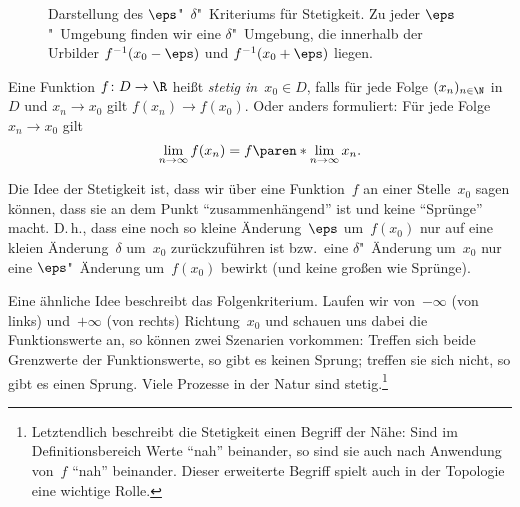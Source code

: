 \documentclass[a4paper]{article}
\begin{document}
\begin{figure}
    \caption{Darstellung des $\eps$"~$\delta$"~Kriteriums für Stetigkeit. Zu jeder $\eps$"~Umgebung finden wir eine $\delta$"~Umgebung, die innerhalb der Urbilder $f^{-1}(x_0-\eps)$ und $f^{-1}(x_0+\eps)$ liegen.}
\end{figure}

\begin{definition}\label{def:continuity:sequence}
    Eine Funktion $f\colon D \to \R$ heißt \emph{stetig in~$x_0 \in D$}, falls für jede Folge $(x_n)_{n\in\N}$ in~$D$ und $x_n \to x_0$ gilt $f(x_n) \to f(x_0)$. Oder anders formuliert: Für jede Folge $x_n \to x_0$ gilt
    \begin{equation*}
        \lim_{n\to\infty} f(x_n) = f\paren*{\lim_{n\to\infty} x_n}.
    \end{equation*}
\end{definition}

Die Idee der Stetigkeit ist, dass wir über eine Funktion~$f$ an einer Stelle~$x_0$ sagen können, dass sie an dem Punkt "`zusammenhängend"' ist und keine "`Sprünge"' macht. D.\,h., dass eine noch so kleine Änderung~$\eps$ um~$f(x_0)$ nur auf eine kleien Änderung~$\delta$ um~$x_0$ zurückzuführen ist bzw.\ eine $\delta$"~Änderung um~$x_0$ nur eine $\eps$"~Änderung um~$f(x_0)$ bewirkt (und keine großen wie Sprünge).

Eine ähnliche Idee beschreibt das Folgenkriterium. Laufen wir von~$-\infty$ (von links) und~$+\infty$ (von rechts) Richtung~$x_0$ und schauen uns dabei die Funktionswerte an, so können zwei Szenarien vorkommen: Treffen sich beide Grenzwerte der Funktionswerte, so gibt es keinen Sprung; treffen sie sich nicht, so gibt es einen Sprung. Viele Prozesse in der Natur sind stetig.\footnote{Letztendlich beschreibt die Stetigkeit einen Begriff der Nähe: Sind im Definitionsbereich Werte "`nah"' beinander, so sind sie auch nach Anwendung von~$f$ "`nah"' beinander. Dieser erweiterte Begriff spielt auch in der Topologie eine wichtige Rolle.}
\end{document}
